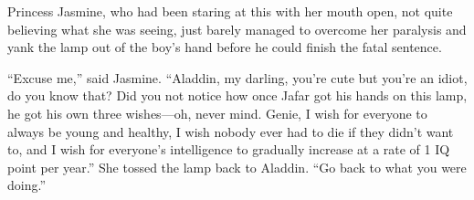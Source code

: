 Princess Jasmine, who had been staring at this with her mouth open, not quite believing what she was seeing, just barely managed to overcome her paralysis and yank the lamp out of the boy’s hand before he could finish the fatal sentence.

“Excuse me,” said Jasmine. “Aladdin, my darling, you’re cute but you’re an idiot, do you know that? Did you not notice how once Jafar got his hands on this lamp, he got his own three wishes—oh, never mind. Genie, I wish for everyone to always be young and healthy, I wish nobody ever had to die if they didn’t want to, and I wish for everyone’s intelligence to gradually increase at a rate of 1 IQ point per year.” She tossed the lamp back to Aladdin. “Go back to what you were doing.”

%

